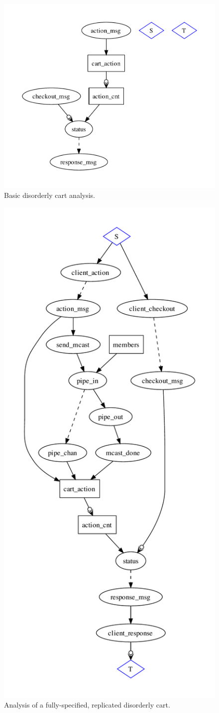 \begin{figure}[t]
\centering
\includegraphics[width=0.6\linewidth]{fig/disorderly_base.pdf}
\vspace{-10pt}
\caption{Basic disorderly cart analysis.}
\label{fig:pdg-disorderly-analysis}
\vspace{-2pt}
\end{figure}

\begin{figure}[t]
\centering
\includegraphics[width=0.6\linewidth]{fig/disorderly_complete.pdf}
\vspace{-10pt}
\caption{Analysis of a fully-specified, replicated disorderly cart.}
\label{fig:pdg-disorderly-analysis}
\vspace{-2pt}
\end{figure}



